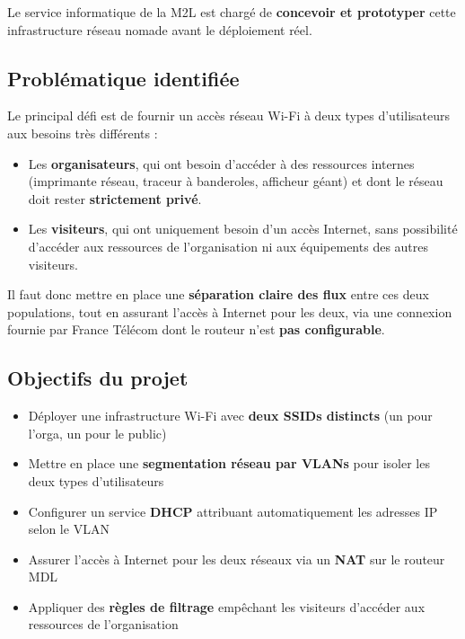 \documentclass[a4paper,12pt]{article}
\begin{document}
Le service informatique de la M2L est chargé de \textbf{concevoir et prototyper} cette infrastructure
réseau nomade avant le déploiement réel.

\subsection{Problématique identifiée}

Le principal défi est de fournir un accès réseau Wi-Fi à deux types d'utilisateurs aux besoins très différents :

\begin{itemize}
  \item Les \textbf{organisateurs}, qui ont besoin d'accéder à des ressources internes
        (imprimante réseau, traceur à banderoles, afficheur géant) et dont le réseau doit rester \textbf{strictement privé}.
  \item Les \textbf{visiteurs}, qui ont uniquement besoin d'un accès Internet, sans possibilité
        d'accéder aux ressources de l'organisation ni aux équipements des autres visiteurs.
\end{itemize}

Il faut donc mettre en place une \textbf{séparation claire des flux} entre ces deux populations,
tout en assurant l'accès à Internet pour les deux, via une connexion fournie par France Télécom
dont le routeur n'est \textbf{pas configurable}.

\subsection{Objectifs du projet}

\begin{itemize}
  \item Déployer une infrastructure Wi-Fi avec \textbf{deux SSIDs distincts} (un pour l'orga, un pour le public)
  \item Mettre en place une \textbf{segmentation réseau par VLANs} pour isoler les deux types d'utilisateurs
  \item Configurer un service \textbf{DHCP} attribuant automatiquement les adresses IP selon le VLAN
  \item Assurer l'accès à Internet pour les deux réseaux via un \textbf{NAT} sur le routeur MDL
  \item Appliquer des \textbf{règles de filtrage} empêchant les visiteurs d'accéder aux ressources de l'organisation
\end{itemize}
\end{document}
